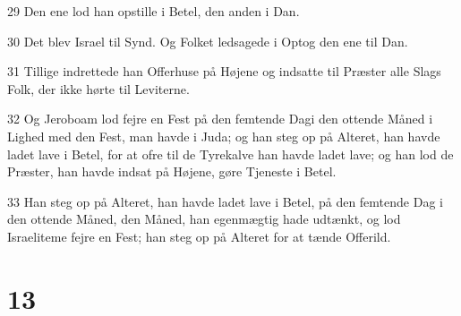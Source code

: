 \par 29 Den ene lod han opstille i Betel, den anden i Dan.
\par 30 Det blev Israel til Synd. Og Folket ledsagede i Optog den ene til Dan.
\par 31 Tillige indrettede han Offerhuse på Højene og indsatte til Præster alle Slags Folk, der ikke hørte til Leviterne.
\par 32 Og Jeroboam lod fejre en Fest på den femtende Dagi den ottende Måned i Lighed med den Fest, man havde i Juda; og han steg op på Alteret, han havde ladet lave i Betel, for at ofre til de Tyrekalve han havde ladet lave; og han lod de Præster, han havde indsat på Højene, gøre Tjeneste i Betel.
\par 33 Han steg op på Alteret, han havde ladet lave i Betel, på den femtende Dag i den ottende Måned, den Måned, han egenmægtig hade udtænkt, og lod Israeliteme fejre en Fest; han steg op på Alteret for at tænde Offerild.

\chapter{13}

